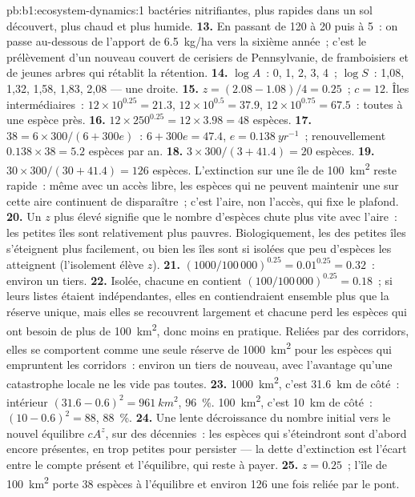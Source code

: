 \begin{solution}{pb:b1:ecosystem-dynamics:1}
bactéries nitrifiantes, plus rapides dans un sol découvert, plus chaud
et plus humide.
\textbf{13.} En passant de \num{120} à \num{20} puis à \num{5}~: on
passe au-dessous de l'apport de \qty{6.5}{kg/ha} vers la sixième année~; c'est
le prélèvement d'un nouveau couvert de cerisiers de Pennsylvanie, de
framboisiers et de jeunes arbres qui rétablit la rétention.
\textbf{14.} $\log A$~: 0, 1, 2, 3, 4~; $\log S$~: 1,08, 1,32, 1,58,
1,83, 2,08 --- une droite.
\textbf{15.} $z = (2.08 - 1.08)/4 = 0.25$~; $c = 12$. Îles
intermédiaires~: $12\times 10^{0.25} = 21.3$, $12\times 10^{0.5} = 37.9$, $12\times
10^{0.75} = 67.5$~: toutes à une espèce près.
\textbf{16.} $12\times 250^{0.25} = 12\times 3.98 = 48$ espèces.
\textbf{17.} $38 = 6\times 300/(6 + 300e)$~: $6 + 300e = 47.4$, $e =
\qty{0.138}{yr^{-1}}$~; renouvellement $0.138\times 38 = 5.2$ espèces par an.
\textbf{18.} $3\times 300/(3 + 41.4) = 20$ espèces.
\textbf{19.} $30\times 300/(30 + 41.4) = 126$ espèces. L'extinction sur
une île de \qty{100}{km^2} reste rapide~: même avec un accès libre, les
espèces qui ne peuvent maintenir une  sur cette aire
continuent de disparaître~; c'est l'aire, non l'accès, qui fixe le
plafond.
\textbf{20.} Un $z$ plus élevé signifie que le nombre d'espèces chute
plus vite avec l'aire~: les petites îles sont relativement plus pauvres.
Biologiquement, les  des petites îles s'éteignent plus
facilement, ou bien les îles sont si isolées que peu d'espèces les
atteignent (l'isolement élève $z$).
\textbf{21.} $(1000/100\,000)^{0.25} = 0.01^{0.25} = 0.32$~: environ un
tiers.
\textbf{22.} Isolée, chacune en contient $(100/100\,000)^{0.25} = 0.18$~;
si leurs listes étaient indépendantes, elles en contiendraient ensemble
plus que la réserve unique, mais elles se recouvrent largement et
chacune perd les espèces qui ont besoin de plus de \qty{100}{km^2}, donc
moins en pratique. Reliées par des corridors, elles se comportent comme
une seule réserve de \qty{1000}{km^2} pour les espèces qui empruntent
les corridors~: environ un tiers de nouveau, avec l'avantage qu'une
catastrophe locale ne les vide pas toutes.
\textbf{23.} \qty{1000}{km^2}, c'est \qty{31.6}{km} de côté~: intérieur
$(31.6 - 0.6)^2 = \qty{961}{km^2}$, \qty{96}{\%}. \qty{100}{km^2},
c'est \qty{10}{km} de côté~: $(10 - 0.6)^2 = 88$, \qty{88}{\%}.
\textbf{24.} Une lente décroissance du nombre initial vers le nouvel
équilibre $cA^z$, sur des décennies~: les espèces qui s'éteindront sont
d'abord encore présentes, en  trop petites pour persister
--- la dette d'extinction est l'écart entre le compte présent et
l'équilibre, qui reste à payer.
\textbf{25.} $z = 0.25$~; l'île de \qty{100}{km^2} porte \num{38}
espèces à l'équilibre et environ \num{126} une fois reliée par le pont.
\end{solution}
